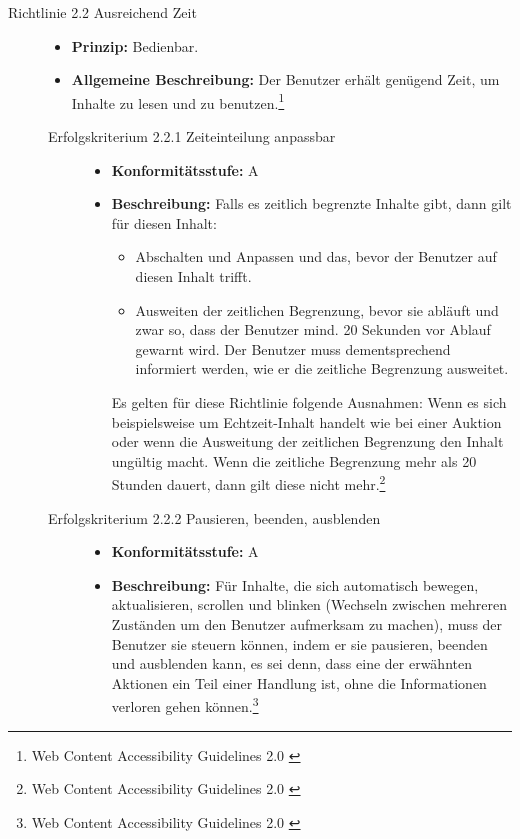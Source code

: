 \begin{description}
	\item[Richtlinie 2.2 Ausreichend Zeit]\hfill
	\begin{itemize}
		\item \textbf{Prinzip:} Bedienbar.
		\item \textbf{Allgemeine Beschreibung:} Der Benutzer erhält genügend Zeit, um Inhalte zu lesen und zu benutzen.\footnote{Web Content Accessibility Guidelines 2.0 \cite{WCAG2.0}}
	\end{itemize}
	
	\begin{description}
		\item[Erfolgskriterium 2.2.1 Zeiteinteilung anpassbar]\hfill
		\begin{itemize}
			\item \textbf{Konformitätsstufe:} A
			\item \textbf{Beschreibung:} Falls es zeitlich begrenzte Inhalte gibt, dann gilt für diesen Inhalt:
			\begin{itemize}
				\item Abschalten und Anpassen und das, bevor der Benutzer auf diesen Inhalt trifft.
				\item Ausweiten der zeitlichen Begrenzung, bevor sie abläuft und zwar so, dass der Benutzer mind. 20 Sekunden vor Ablauf gewarnt wird. Der Benutzer muss 
				dementsprechend informiert werden, wie er die zeitliche Begrenzung ausweitet.
			\end{itemize}
			Es gelten für diese Richtlinie folgende Ausnahmen: Wenn es sich beispielsweise um Echtzeit-Inhalt handelt wie bei einer Auktion oder wenn die Ausweitung 
			der zeitlichen Begrenzung den Inhalt ungültig macht. Wenn die zeitliche Begrenzung mehr als 20 Stunden dauert, dann gilt diese nicht 
			mehr.\footnote{Web Content Accessibility Guidelines 2.0 \cite{WCAG2.0}}
		\end{itemize}
		
		\item[Erfolgskriterium 2.2.2 Pausieren, beenden, ausblenden]\hfill
		\begin{itemize}
			\item \textbf{Konformitätsstufe:} A
			\item \textbf{Beschreibung:} Für Inhalte, die sich automatisch bewegen, aktualisieren, scrollen und blinken (Wechseln zwischen mehreren Zuständen um den 
			Benutzer aufmerksam zu machen), muss der Benutzer sie steuern können, indem er sie pausieren, beenden und ausblenden kann, es sei denn, dass eine der 
			erwähnten Aktionen ein Teil einer Handlung ist, ohne die Informationen verloren gehen können.\footnote{Web Content Accessibility Guidelines 2.0 \cite{WCAG2.0}}
		\end{itemize}
		

\end{description}
\end{description}
